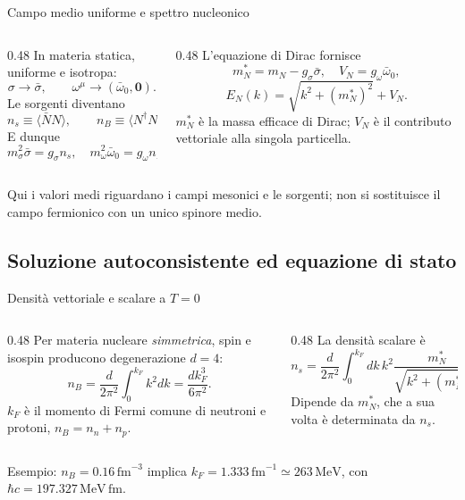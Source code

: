 \begin{frame}{Campo medio uniforme e spettro nucleonico}
\small
\begin{columns}[T,onlytextwidth]
\begin{column}{0.48\textwidth}
In materia statica, uniforme e isotropa:
\[
 \sigma\to\bar\sigma,\qquad
 \omega^\mu\to(\bar\omega_0,\mathbf0).
\]
Le sorgenti diventano
\[
 n_s\equiv\langle\bar NN\rangle,\qquad
 n_B\equiv\langle N^\dagger N\rangle.
\]
E dunque
\[
 m_\sigma^2\bar\sigma=g_\sigma n_s,
 \quad m_\omega^2\bar\omega_0=g_\omega n_B.
\]
\end{column}
\begin{column}{0.48\textwidth}
L'equazione di Dirac fornisce
\[
 m_N^*=m_N-g_\sigma\bar\sigma,
 \quad V_N=g_\omega\bar\omega_0,
\]
\[
 E_N(k)=\sqrt{k^2+(m_N^*)^2}+V_N.
\]
$m_N^*$ è la massa efficace di Dirac; $V_N$ è il contributo vettoriale alla singola particella.
\end{column}
\end{columns}
\medskip
Qui i valori medi riguardano i campi mesonici e le sorgenti; non si sostituisce il campo fermionico con un unico spinore medio.
\end{frame}

\subsection{Soluzione autoconsistente ed equazione di stato}

\begin{frame}{Densità vettoriale e scalare a $T=0$}
\small
\begin{columns}[T,onlytextwidth]
\begin{column}{0.48\textwidth}
Per materia nucleare \emph{simmetrica}, spin e isospin producono degenerazione $d=4$:
\[
 n_B=\frac{d}{2\pi^2}\int_0^{k_F}\!k^2dk
 =\frac{dk_F^3}{6\pi^2}.
\]
$k_F$ è il momento di Fermi comune di neutroni e protoni, $n_B=n_n+n_p$.
\end{column}
\begin{column}{0.48\textwidth}
La densità scalare è
\[
 n_s=\frac{d}{2\pi^2}
 \int_0^{k_F}\! dk\,k^2
 \frac{m_N^*}{\sqrt{k^2+(m_N^*)^2}}.
\]
Dipende da $m_N^*$, che a sua volta è determinata da $n_s$.
\end{column}
\end{columns}
\medskip
Esempio: $n_B=0.16\,\mathrm{fm}^{-3}$ implica $k_F=1.333\,\mathrm{fm}^{-1}\simeq263\,\mathrm{MeV}$, con $\hbar c=197.327\,\mathrm{MeV\,fm}$.
\end{frame}

